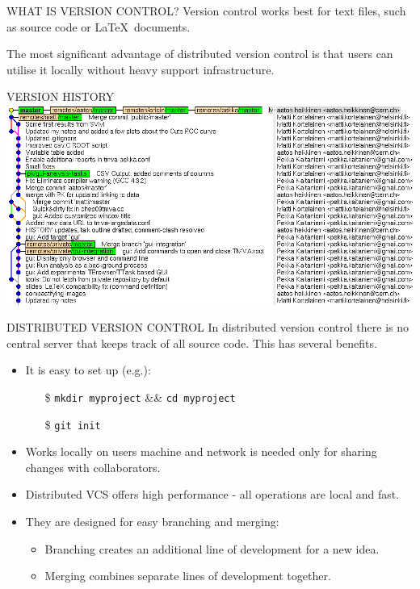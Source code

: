 \documentclass[final,hyperref={pdfpagelabels=false},notitlepage=true]{beamer}
\begin{document}
\begin{frame}{}
\begin{columns}[t]
\begin{column}{0.45\linewidth}
\begin{block}{\large WHAT IS VERSION CONTROL?}
      \vskip1cm
      Version control {\color{orange} works best for} text files, such as {\color{orange} source code} or \LaTeX\ documents.

\vskip1cm
The most significant advantage of distributed version control is that 
users can utilise it locally without heavy support infrastructure.

    \end{block}

    \vskip2cm
    \begin{block}{\large VERSION HISTORY}
      \vskip1cm
      \includegraphics[width=1.0\linewidth]{images/gitk-history-detail.png}
    \end{block}

    \vskip4cm
    \begin{block}{\large DISTRIBUTED VERSION CONTROL}
      \vskip1cm
      In distributed version control there is {\color{orange} no central server}
      that keeps track of all source code. This has several benefits.
      \vskip1cm
      \begin{itemize}
        \item It is easy to set up (e.g.):
          \begin{itemize}
            \item[\$] {\tt mkdir myproject} \&\& {\tt cd myproject}
            \item[\$] {\tt git init}
          \end{itemize}
          \vskip1cm
        \item Works locally on users machine and network is needed
          only for sharing changes with collaborators.
          \vskip1cm
        \item Distributed VCS offers high performance - all operations are local and fast.
          \vskip1cm
        \item They are {\color{orange} designed for easy branching and merging}:
          \begin{itemize}
            \item Branching creates an additional line of
              development for a new idea.
            \item Merging combines separate lines of development
              together.
          \end{itemize}
      \end{itemize}
    \end{block}


\end{column}
\end{columns}
\end{frame}
\end{document}
